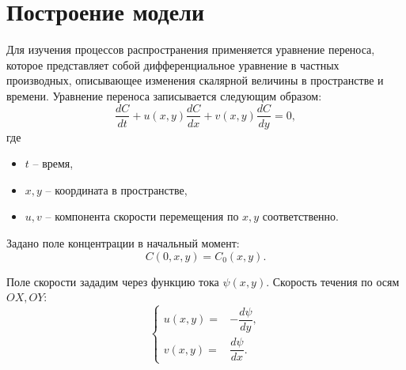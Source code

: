 \pagebreak

\section{Построение модели}
	Для изучения процессов распространения применяется уравнение переноса, которое представляет собой дифференциальное уравнение в частных производных, описывающее изменения скалярной величины в пространстве и времени. Уравнение переноса записывается следующим образом:
	\begin{equation}
		\dfrac{dC}{dt} + u(x, y)\dfrac{dC}{dx} + v(x, y)\dfrac{dC}{dy} = 0,
	\end{equation}
	где
	\begin{itemize}
		\item \( t \) -- время,
		\item \( x, y \) -- координата в пространстве,
		\item \( u, v \) -- компонента скорости перемещения по \( x, y \) соответственно.
	\end{itemize}

	Задано поле концентрации в начальный момент:
	\begin{equation}
		C(0, x, y) = C_0(x, y).
	\end{equation}

	Поле скорости зададим через функцию тока \( \psi(x, y) \). Скорость течения по осям \( OX, OY \):
	\begin{equation}
		\begin{cases}
			u(x, y) = & - \dfrac{d \psi}{d y}, \\
			v(x, y) = & \dfrac{d \psi}{d x}.
		\end{cases}
	\end{equation}
	

\pagebreak